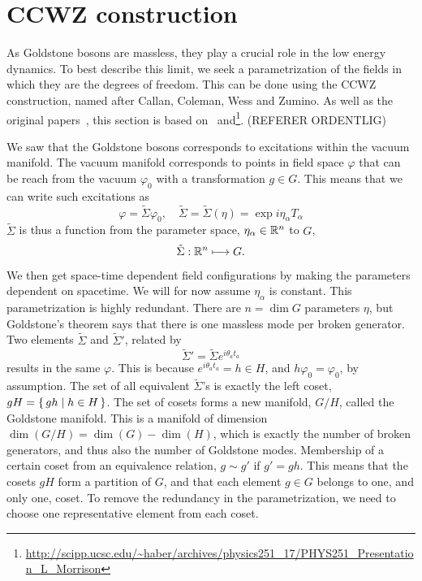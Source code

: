\section{CCWZ construction}
\label{seciton:ccwz construction}

As Goldstone bosons are massless, they play a crucial role in the low energy dynamics.
To best describe this limit, we seek a parametrization of the fields in which they are the degrees of freedom.
This can be done using the CCWZ construction, named after Callan, Coleman, Wess and Zumino.
As well as the original papers~\cite{Structure_of_phen_1,Structure_of_phen_2}, this section is based on~\cite{weinberg_1996_vol2,The_composite_NG_Higgs,effective_FT_with_NG_modes} and\footnote{\url{http://scipp.ucsc.edu/~haber/archives/physics251_17/PHYS251_Presentation_L_Morrison}}. (REFERER ORDENTLIG)


We saw that the Goldstone bosons corresponds to excitations within the vacuum manifold.
The vacuum manifold corresponds to points in field space $\varphi$ that can be reach from the vacuum $\varphi_0$ with a transformation $g \in G$.
This means that we can write such excitations as
\begin{equation}
    \varphi = \tilde\Sigma \varphi_0, \quad \tilde \Sigma = \tilde \Sigma(\eta) = \exp{i \eta_\alpha T_\alpha}
\end{equation}
$\tilde \Sigma$ is thus a function from the parameter space, $\eta_\alpha \in \mathbb{R}^n$ to $G$,
\begin{align}
    \tilde \Sigma: \mathbb{R}^n \longmapsto G.
\end{align}
We then get space-time dependent field configurations by making the parameters dependent on spacetime.
We will for now assume $\eta_\alpha$ is constant.
This parametrization is highly redundant.
There are $n = \dim G$ parameters $\eta$, but Goldstone's theorem says that there is one massless mode per broken generator.
Two elements $\tilde\Sigma$ and $\tilde\Sigma'$, related by
\begin{equation}
    \tilde \Sigma' = \tilde\Sigma e^{i \theta_a t_a}
\end{equation}
results in the same $\varphi$.
This is because  $e^{i \theta_a t_a} = h \in H$, and $h \varphi_0 = \varphi_0$, by assumption.
The set of all equivalent $\tilde \Sigma$'s is exactly the left coset, $gH = \left\{\, gh \mid  h \in H \,\right\}$.
The set of cosets forms a new manifold, $G / H$, called the Goldstone manifold.
This is a manifold of dimension $\dim(G/H) = \dim(G) - \dim(H)$, which is exactly the number of broken generators, and thus also the number of Goldstone modes.
Membership of a certain coset from an equivalence relation, $g \sim g'$ if $g' = gh$.
This means that the cosets $gH$ form a partition of $G$, and that each element $g \in G$ belongs to one, and only one, coset.
To remove the redundancy in the parametrization, we need to choose one representative element from each coset.

